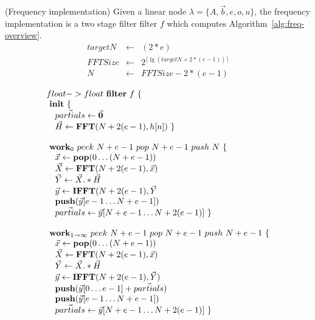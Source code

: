 \begin{transformation} (Frequency implementation)
Given a linear node $\lambda = \{A, {\vec b}, e, o, u\}$, 
the frequency implementation is a two stage filter filter $f$ which
computes Algorithm~\ref{alg:freq-overview}. 
\\
\begin{equation} \nonumber
  \begin{array}{rcl}
    targetN & \leftarrow & (2*e) \\
    FFTSize & \leftarrow & 2^{\lceil \lg(targetN + 2*(e-1)) \rceil} \\
    N       & \leftarrow & FFTSize - 2*(e-1) \\ 
  \end{array}
\end{equation}
\begin{equation} \nonumber
  \begin{array}{l}
    float->float~{\bf filter}~f~\{ \\
    ~{\bf init}~\{ \\
    ~~~\vec{partials} \leftarrow \vec{\mathbf{0}} \\
    ~~~\vec{H} \leftarrow \mathbf{FFT}(N+2(e-1),h[n])~\} \\
    \\
    ~{\bf work}_{0}~peek~N+e-1~pop~N+e-1~push~N~\{\\
    ~~~\vec{x} \leftarrow \mathbf{pop}(0 \dots (N+e-1)) \\
    ~~~\vec{X} \leftarrow \mathbf{FFT} (N+2(e-1), \vec{x}) \\
    ~~~\vec{Y} \leftarrow \vec{X} .* \vec{H} \\
    ~~~\vec{y} \leftarrow \mathbf{IFFT}(N+2(e-1), \vec{Y} \\
    ~~~\mathbf{push}(\vec{y}[e-1 \dots N+e-1]) \\
    ~~~\vec{partials} \leftarrow \vec{y}[N+e-1 \dots N+2(e-1)]~\} \\
    \\
    ~{\bf work}_{1 \rightarrow \infty}~peek~N+e-1~pop~N+e-1~push~N+e-1~\{ \\
    ~~~\vec{x} \leftarrow \mathbf{pop}(0 \dots (N+e-1)) \\
    ~~~\vec{X} \leftarrow \mathbf{FFT} (N+2(e-1), \vec{x}) \\
    ~~~\vec{Y} \leftarrow \vec{X} .* \vec{H} \\
    ~~~\vec{y} \leftarrow \mathbf{IFFT}(N+2(e-1), \vec{Y}) \\
    ~~~\mathbf{push}(\vec{y}[0 \dots e-1] + \vec{partials})\\
    ~~~\mathbf{push}(\vec{y}[e-1 \dots N+e-1]) \\
    ~~~\vec{partials} \leftarrow \vec{y}[N+e-1 \dots N+2(e-1)]~\} \\
  \end{array} \\
\end{equation}
\label{trans:freq}
\end{transformation}



